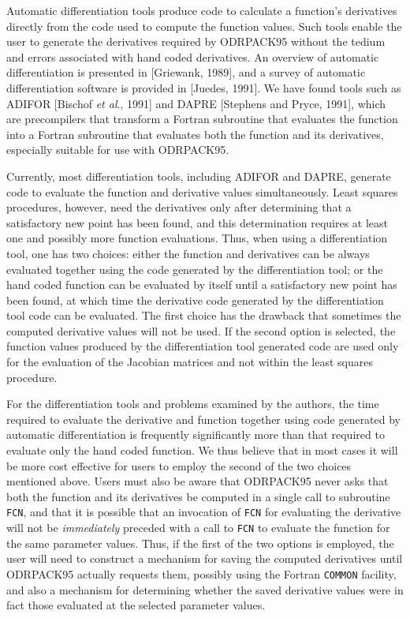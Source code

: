 \bigskip{}\medskip

\noindent Automatic differentiation tools produce code to calculate a function's
derivatives directly from the code used to compute the function values. Such
tools enable the user to generate the derivatives required by ODRPACK95 without
the tedium and errors associated with hand coded derivatives. An overview of
automatic differentiation is presented in [Griewank, 1989], and a survey of
automatic differentiation software is provided in [Juedes, 1991]. We have found
tools such as ADIFOR [Bischof {\it et al}., 1991] and DAPRE [Stephens and Pryce,
1991], which are precompilers that transform a Fortran subroutine that evaluates
the function into a Fortran subroutine that evaluates both the function and its
derivatives, especially suitable for use with ODRPACK95.

\noindent Currently, most differentiation tools, including ADIFOR and DAPRE, generate code to evaluate the function and derivative values simultaneously. Least squares procedures, however, need the derivatives only after determining that a satisfactory new point has been found, and this determination requires at least one and possibly more function evaluations. Thus, when using a differentiation tool, one has two choices: either the function and derivatives can be always evaluated together using the code generated by the differentiation tool; or the hand coded function can be evaluated by itself until a satisfactory new point has been found, at which time the derivative code generated by the differentiation tool code can be evaluated. The first choice has the drawback that sometimes the computed derivative values will not be used. If the second option is selected, the function values produced by the differentiation tool generated code are used only for the evaluation of the Jacobian matrices and not within the least squares procedure.

\noindent For the differentiation tools and problems examined by the authors,
the time required to evaluate the derivative and function together using code
generated by automatic differentiation is frequently significantly more than
that required to evaluate only the hand coded function. We thus believe that in
most cases it will be more cost effective for users to employ the second of the
two choices mentioned above. Users must also be aware that ODRPACK95 never asks
that both the function and its derivatives be computed in a single call to
subroutine {\tt FCN}, and that it is possible that an invocation of {\tt FCN}
for evaluating the derivative will not be {\it immediately} preceded with a call
to {\tt FCN} to evaluate the function for the same parameter values. Thus, if
the first of the two options is employed, the user will need to construct a
mechanism for saving the computed derivatives until ODRPACK95 actually requests them, possibly using the Fortran {\tt COMMON} facility, and also a mechanism for determining whether the saved derivative values were in fact those evaluated at the selected parameter values.

